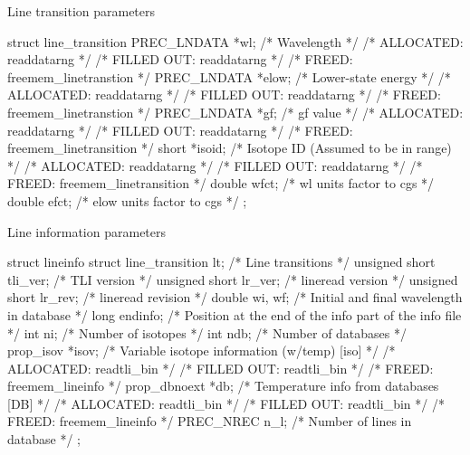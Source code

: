 \documentclass[letterpaper,12pt]{article}
\begin{document}
\noindent \newline
Line transition parameters
\begin{plain}
struct line_transition{
  PREC_LNDATA *wl;       /* Wavelength                                      */
    /* ALLOCATED:	readdatarng					    */
    /* FILLED OUT:	readdatarng					    */
    /* FREED: 		freemem_linetranstion				    */ 
  PREC_LNDATA *elow;     /* Lower-state energy                              */
    /* ALLOCATED:	readdatarng					    */
    /* FILLED OUT:	readdatarng					    */
    /* FREED: 		freemem_linetranstion				    */ 
  PREC_LNDATA *gf;       /* gf value                                        */
    /* ALLOCATED:	readdatarng					    */
    /* FILLED OUT:	readdatarng					    */
    /* FREED: 		freemem_linetransition				    */ 
  short *isoid;          /* Isotope ID (Assumed to be in range)             */
    /* ALLOCATED:	readdatarng					    */
    /* FILLED OUT:	readdatarng					    */
    /* FREED: 		freemem_linetransition				    */ 
  double wfct;           /* wl units factor to cgs                          */
  double efct;           /* elow units factor to cgs                        */
};
\end{plain}

\noindent \newline
Line information parameters
\begin{plain}
struct lineinfo{
  struct line_transition lt; /* Line transitions                            */
  unsigned short tli_ver;    /* TLI version                                 */
  unsigned short lr_ver;     /* lineread version                            */
  unsigned short lr_rev;     /* lineread revision                           */
  double wi, wf;             /* Initial and final wavelength in database    */
  long endinfo;              /* Position at the end of the info part
                                of the info file                            */
  int ni;                    /* Number of isotopes                          */
  int ndb;                   /* Number of databases                         */
  prop_isov *isov;           /* Variable isotope information (w/temp) [iso] */
    /* ALLOCATED:	readtli_bin					    */
    /* FILLED OUT:	readtli_bin					    */
    /* FREED: 		freemem_lineinfo				    */ 
  prop_dbnoext *db;          /* Temperature info from databases [DB]        */
    /* ALLOCATED:	readtli_bin					    */
    /* FILLED OUT:	readtli_bin					    */
    /* FREED: 		freemem_lineinfo				    */ 
  PREC_NREC n_l;             /* Number of lines in database                 */
};
\end{plain}
\end{document}
